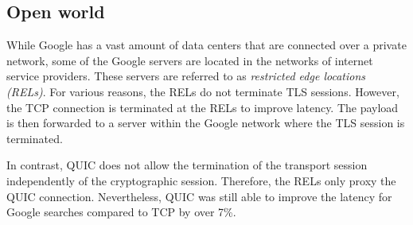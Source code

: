\documentclass[conference]{IEEEtran}
\begin{document}
\subsection{Open world}

While Google has a vast amount of data centers that are connected over a private network, some of the Google servers are located in the networks of internet service providers. These servers are referred to as \textit{restricted edge locations (RELs)}. For various reasons, the RELs do not terminate TLS sessions. However, the TCP connection is terminated at the RELs to improve latency. The payload is then forwarded to a server within the Google network where the TLS session is terminated. \cite{Google}

In contrast, QUIC does not allow the termination of the transport session independently of the cryptographic session. Therefore, the RELs only proxy the QUIC connection. Nevertheless, QUIC was still able to improve the latency for Google searches compared to TCP by over 7\%. 



\end{document}
